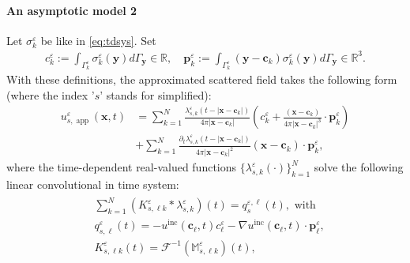 \documentclass[]{article}
\numberwithin{equation}{section}
\numberwithin{theorem}{section}
\numberwithin{lemma}{section}
\numberwithin{corollary}{section}
\numberwithin{proposition}{section}
\numberwithin{definition}{section}
\newcommand{\bc}{\boldsymbol{c}}
\newcommand{\re}{\varepsilon}
\renewcommand{\vec}{\boldsymbol}
\begin{document}
	\paragraph{An asymptotic model 2}
	Let $\sigma_k^{\re}$ be like in \eqref{eq:tdsys}.
	Set
	\begin{align}
		\label{eq:ckre}
		c_k^{\varepsilon}:=\int_{\Gamma^{\varepsilon}_k}\sigma^{\varepsilon}_k(\vec{y})d\Gamma_{\vec{y}}\in \mathbb{R}, \quad \vec{p}_k^{\varepsilon}:=\int_{\Gamma^{\varepsilon}_k}(\vec{y}-\bc_k)\sigma_k^{\varepsilon}(\vec{y})d\Gamma_{\vec{y}}\in \mathbb{R}^3.
	\end{align}
	With these definitions, the approximated scattered field takes the following form (where the index '$s$' stands for simplified): 
	\begin{align*}%
		{u}^{\varepsilon}_{s,\operatorname{\operatorname{app}}}(\vec{x},t)&=\sum\limits_{k=1}^N\frac{{\lambda}^{\varepsilon}_{s,k}(t-|\vec{x}-\bc_k|)}{4\pi|\vec{x}-\bc_k|}\left(c_k^{\varepsilon}+\frac{(\vec{x}-\bc_k)}{4\pi|\vec{x}-\bc_k|^3}\cdot \vec{p}_k^{\varepsilon}\right)\\
		&+\sum\limits_{k=1}^N\frac{\partial_t{\lambda}^{\varepsilon}_{s,k}(t-|\vec{x}-\bc_k|)}{4\pi|\vec{x}-\bc_k|^2}(\vec{x}-\bc_k)\cdot\vec{p}_k^{\varepsilon},
	\end{align*}
	where the time-dependent real-valued functions $ \{ \lambda^{\re}_{s,k}(\cdot) \}_{k=1}^N $ solve the following linear convolutional in time system:
	\begin{align}
		\label{eq:tdsys2}
		\begin{split}
			& \sum_{k=1}^N (K^{\re}_{s, \ell k }*\lambda^{\re}_{s, k})(t)={q}_{s}^{\re,\ell }(t), \text{ with }	\\
			&q^{\re}_{s, \ell}(t)=- u^{\operatorname{inc}}(\vec{c}_{\ell},t)c_{\ell}^{\re}-\nabla u^{\operatorname{inc}}(\vec{c}_{\ell}, t)\cdot\vec{p}_{\ell}^{\re}, \\
			& K^{\re}_{s, \ell k }(t) = \mathcal{F}^{-1} (\mathbb{M}^{\re}_{s, \ell k})(t),
		\end{split}
	\end{align}
\end{document}
